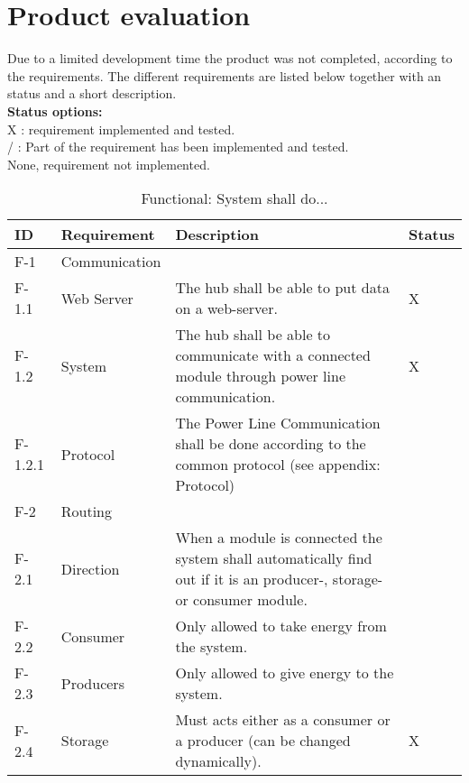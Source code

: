 \section{Product evaluation}
Due to a limited development time the product was not completed, according to the requirements. The different requirements are listed below together with an status and a short description.
\\\textbf{Status options:}
\\ X : requirement implemented and tested.
\\ / : Part of the requirement has been implemented and tested.
\\ None, requirement not implemented.
\begin{table}[H]
	\begin{tabular} [b] {| p{1.1cm} |  p{2.5cm} | p{11.0cm} | p{1.0cm} |}
	\hline
	\textbf{ID} & \textbf{Requirement} & \textbf{Description} & Status\\\hline
		F-1 & Communication 	&  ~ & ~ \\ \hline
		F-1.1 & Web Server 		& The hub shall be able to put data on a web-server. & X \\ \hline
		F-1.2 & System 		& The hub shall be able to communicate with a connected module through power line communication. & X \\ \hline
		F-1.2.1 & Protocol 		& The Power Line Communication shall be done according to the common protocol (see appendix: Protocol) & ~ \\ \hline
		F-2 & Routing 			&~&~\\ \hline
		F-2.1 & Direction		& When a module is connected the system shall automatically find out if it is an producer-, storage- or consumer module. & ~ \\ \hline
		F-2.2 & Consumer		& Only allowed to take energy from the system. & ~ \\ \hline
		F-2.3 & Producers 		& Only allowed to give energy to the system. & ~ \\ \hline
		F-2.4 & Storage 		& Must acts either as a consumer or a producer (can be changed dynamically). & X \\ \hline
	\end{tabular}
	\caption{Functional: System shall do...}
\end{table}
